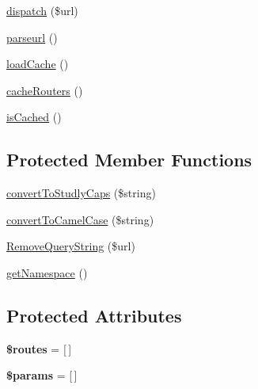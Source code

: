 \begin{DoxyCompactItemize}
\item 
\mbox{\hyperlink{class_zest_1_1_router_1_1_router_aa1582e6a62dc40179f53a4a3705c044e}{dispatch}} (\$url)
\item 
\mbox{\hyperlink{class_zest_1_1_router_1_1_router_a7366d2dcd78903bd5baca0ec280d180e}{parseurl}} ()
\item 
\mbox{\hyperlink{class_zest_1_1_router_1_1_router_ab8c3ec4d9f977b32b63e6fc3393c2a83}{load\+Cache}} ()
\item 
\mbox{\hyperlink{class_zest_1_1_router_1_1_router_a51dd0e2e8e330032b9bfaa0d4b077638}{cache\+Routers}} ()
\item 
\mbox{\hyperlink{class_zest_1_1_router_1_1_router_afac82e816d0fc5049c3295f0d356acdb}{is\+Cached}} ()
\end{DoxyCompactItemize}
\subsection*{Protected Member Functions}
\begin{DoxyCompactItemize}
\item 
\mbox{\hyperlink{class_zest_1_1_router_1_1_router_a6201cf73444ddfadfca25d437f49fd1b}{convert\+To\+Studly\+Caps}} (\$string)
\item 
\mbox{\hyperlink{class_zest_1_1_router_1_1_router_ac8113e94342833c6df305638210875f5}{convert\+To\+Camel\+Case}} (\$string)
\item 
\mbox{\hyperlink{class_zest_1_1_router_1_1_router_a3dd72e2d1640550f7a9a083d24a6b0ea}{Remove\+Query\+String}} (\$url)
\item 
\mbox{\hyperlink{class_zest_1_1_router_1_1_router_a2614df64646ac71b70b1e1074258052b}{get\+Namespace}} ()
\end{DoxyCompactItemize}
\subsection*{Protected Attributes}
\begin{DoxyCompactItemize}
\item 
\mbox{\label{class_zest_1_1_router_1_1_router_a8f7eb04a54e0f0bfc0cedeb9899ce4a8}} 
{\bfseries \$routes} = \mbox{[}$\,$\mbox{]}
\item 
\mbox{\label{class_zest_1_1_router_1_1_router_afe68e6fbe7acfbffc0af0c84a1996466}} 
{\bfseries \$params} = \mbox{[}$\,$\mbox{]}
\end{DoxyCompactItemize}


